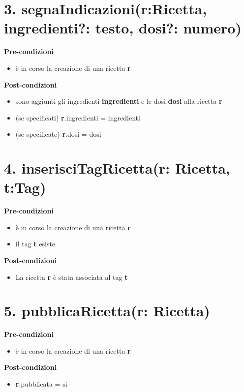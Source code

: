 \documentclass[12pt]{extarticle}
\begin{document}
\section*{3. segnaIndicazioni(r:Ricetta, ingredienti?: testo, dosi?: numero)}

\textbf{Pre-condizioni}
\begin{itemize}
  \item è in corso la creazione di una ricetta  \textbf{r}
\end{itemize}
\textbf{Post-condizioni}
\begin{itemize}
  \item sono aggiunti gli ingredienti  \textbf{ingredienti} e le dosi  \textbf{dosi} alla ricetta \textbf{r}
  \item (se specificati) \textbf{r}.ingredienti = ingredienti
  \item (se specificate) \textbf{r}.dosi = dosi
\end{itemize}



\section*{4. inserisciTagRicetta(r: Ricetta, t:Tag)}

\textbf{Pre-condizioni}
\begin{itemize}
  \item è in corso la creazione di una ricetta  \textbf{r}
  \item il tag \textbf{t} esiste
\end{itemize}
\textbf{Post-condizioni}
\begin{itemize}
  \item La ricetta  \textbf{r} è stata associata al tag \textbf{t} 
\end{itemize}

\section*{5. pubblicaRicetta(r: Ricetta)}

\textbf{Pre-condizioni}
\begin{itemize}
  \item è in corso la creazione di una ricetta  \textbf{r}
\end{itemize}
\textbf{Post-condizioni}
\begin{itemize}
  \item \textbf{r}.pubblicata = si
\end{itemize}
\end{document}
